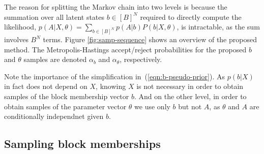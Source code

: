 The reason for splitting the Markov chain into two levels is because the summation over all latent states $b \in [B]^N$ required to directly compute the likelihood, $p(A| X, \theta) = \sum_{b \in [B]^N} p(A | b) P(b | X, \theta)$,
is intractable, as the sum involves $B^N$ terms. 
Figure \ref{fig:samp-sequence} shows an overview of the proposed method. 
The Metropolis-Hastings accept/reject probabilities 
for the proposed $b$ and $\theta$ samples are denoted $\alpha_b$ and
$\alpha_\theta$, respectively.

Note the importance of the simplification in~(\ref{eqn:b-pseudo-prior}). 
As $p(b| X)$ in fact does not depend on $X$, 
knowing $X$ is not necessary in order to obtain samples
of the block membership vector $b$.
And on the other level, in order to obtain 
samples of the parameter vector $\theta$
we use only $b$ but not $A$, as $\theta$ and $A$ are
conditionally independnet given $b$. 

\FloatBarrier

\subsection{Sampling block memberships}


